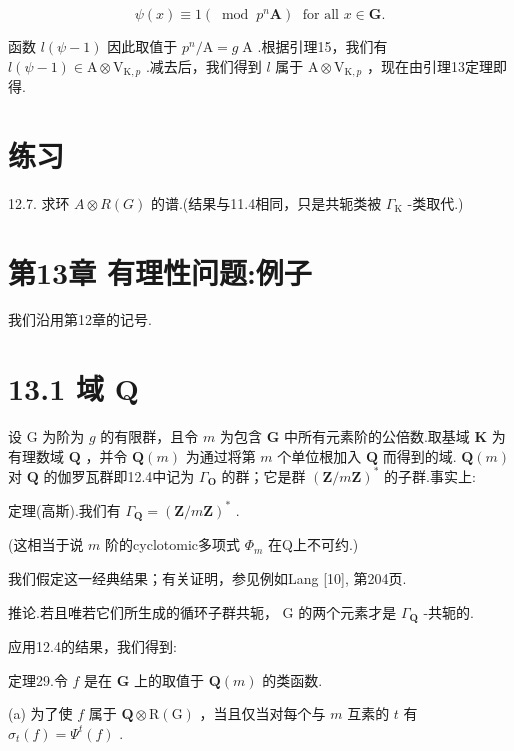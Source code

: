\documentclass[10pt]{article}
\begin{document}
\[
\psi \left( x\right)  \equiv  1\left( {\;\operatorname{mod}\;{p}^{n}\mathbf{A}}\right) \;\text{ for all }x \in  \mathbf{G}.
\]

函数 \(l\left( {\psi  - 1}\right)\) 因此取值于 \({p}^{n}/\mathrm{A} = g\mathrm{\;A}\) .根据引理15，我们有 \(l\left( {\psi  - 1}\right)  \in  \mathrm{A} \otimes  {\mathrm{V}}_{\mathrm{K},p}\) .减去后，我们得到 \(l\) 属于 \(\mathrm{A} \otimes  {\mathrm{V}}_{\mathrm{K},p}\) ，现在由引理13定理即得.

\section*{练习}

12.7. 求环 \(A \otimes  R\left( G\right)\) 的谱.(结果与11.4相同，只是共轭类被 \({\Gamma }_{\mathrm{K}}\) -类取代.)

\section*{第13章 有理性问题:例子}

我们沿用第12章的记号.

\section*{13.1 域 \(\mathbf{Q}\)}

设 \(\mathrm{G}\) 为阶为 \(g\) 的有限群，且令 \(m\) 为包含 \(\mathbf{G}\) 中所有元素阶的公倍数.取基域 \(\mathbf{K}\) 为有理数域 \(\mathbf{Q}\) ，并令 \(\mathbf{Q}\left( m\right)\) 为通过将第 \(m\) 个单位根加入 \(\mathbf{Q}\) 而得到的域. \(\mathbf{Q}\left( m\right)\) 对 \(\mathbf{Q}\) 的伽罗瓦群即12.4中记为 \({\Gamma }_{\mathbf{O}}\) 的群；它是群 \({\left( \mathbf{Z}/m\mathbf{Z}\right) }^{ * }\) 的子群.事实上:

定理(高斯).我们有 \({\Gamma }_{\mathbf{Q}} = {\left( \mathbf{Z}/m\mathbf{Z}\right) }^{ * }\) .

(这相当于说 \(m\) 阶的cyclotomic多项式 \({\Phi }_{m}\) 在Q上不可约.)

我们假定这一经典结果；有关证明，参见例如Lang [10], 第204页.

推论.若且唯若它们所生成的循环子群共轭， \(\mathrm{G}\) 的两个元素才是 \({\Gamma }_{\mathbf{Q}}\) -共轭的.

应用12.4的结果，我们得到:

定理29.令 \(f\) 是在 \(\mathbf{G}\) 上的取值于 \(\mathbf{Q}\left( m\right)\) 的类函数.

(a) 为了使 \(f\) 属于 \(\mathbf{Q} \otimes  \mathrm{R}\left( \mathrm{G}\right)\) ，当且仅当对每个与 \(m\) 互素的 \(t\) 有 \({\sigma }_{t}\left( f\right)  = {\Psi }^{t}\left( f\right)\) .
\end{document}
